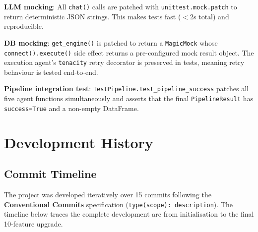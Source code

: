 \documentclass[12pt,a4paper]{report}
\begin{document}
\textbf{LLM mocking}: All \texttt{chat()} calls are patched with \texttt{unittest.mock.patch}
to return deterministic JSON strings. This makes tests fast ($<$2s total) and reproducible.

\textbf{DB mocking}: \texttt{get\_engine()} is patched to return a \texttt{MagicMock} whose
\texttt{connect().execute()} side effect returns a pre-configured mock result object. The
execution agent's \texttt{tenacity} retry decorator is preserved in tests, meaning retry
behaviour is tested end-to-end.

\textbf{Pipeline integration test}: \texttt{TestPipeline.test\_pipeline\_success} patches all
five agent functions simultaneously and asserts that the final \texttt{PipelineResult} has
\texttt{success=True} and a non-empty DataFrame.

\chapter{Development History}
\label{ch:history}

\section{Commit Timeline}

The project was developed iteratively over 15 commits following the
\textbf{Conventional Commits} specification (\texttt{type(scope): description}). The timeline
below traces the complete development arc from initialisation to the final 10-feature upgrade.
\end{document}

